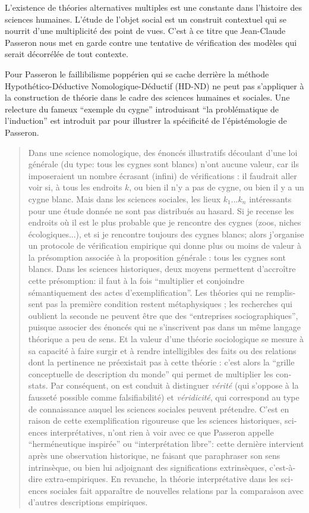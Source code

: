 
L’existence de théories alternatives multiples est une constante dans l’histoire des sciences humaines. L'étude de l'objet social est un construit contextuel qui se nourrit d'une multiplicité des point de vues. C'est à ce titre que Jean-Claude Passeron \autocite{Passeron2006} nous met en garde contre une tentative de vérification  des modèles qui serait décorrélée de tout contexte. 

Pour Passeron le faillibilisme poppérien qui se cache derrière la méthode Hypothético-Déductive Nomologique-Déductif (HD-ND) ne peut pas s'appliquer à la construction de théorie dans le cadre des sciences humaines et sociales. Une relecture du fameux \enquote{exemple du cygne} introduisant \enquote{la problématique de l'induction} est introduit par \cite{Allard2000} pour illustrer la spécificité de l'épistémologie de Passeron.

\foreignblockquote{english}[\cite{Allard2000}]{Dans une science nomologique, des énoncés illustratifs découlant d’une loi générale (du type: tous les cygnes sont blancs) n’ont aucune valeur, car ils imposeraient un nombre écrasant (infini) de vérifications : il faudrait aller voir si, à tous les endroits $k$, ou bien il n’y a pas de cygne, ou bien il y a un cygne blanc. Mais dans les sciences sociales, les lieux $k_1 ... k_n$ intéressants pour une étude donnée ne sont pas distribués au hasard. Si je recense les endroits où il est le plus probable que je rencontre des cygnes (zoos, niches écologiques...), et si je rencontre toujours des cygnes blancs; alors j’organise un protocole de vérification empirique qui donne plus ou moins de valeur à la présomption associée à la proposition générale : tous les cygnes sont blancs. Dans les sciences historiques, deux moyens permettent d’accroître cette présomption: il faut à la fois \enquote{multiplier et conjoindre sémantiquement des actes d’exemplification}. Les théories qui ne remplissent pas la première condition restent métaphysiques ; les recherches qui oublient la seconde ne peuvent être que des \enquote{entreprises sociographiques}, puisque associer des énoncés qui ne s’inscrivent pas dans un même langage théorique a peu de sens. Et la valeur d’une théorie sociologique se mesure à sa capacité à faire surgir et à rendre intelligibles des faits ou des relations dont la pertinence ne préexistait pas à cette théorie : c’est alors la \enquote{grille conceptuelle de description du monde} qui permet de multiplier les constats. Par conséquent, on est conduit à distinguer \textit{vérité} (qui s’oppose à la fausseté possible comme falsifiabilité) et \textit{véridicité}, qui correspond au type de connaissance auquel les sciences sociales peuvent prétendre. C’est en raison de cette exemplification rigoureuse que les sciences historiques, sciences interprétatives, n’ont rien à voir avec ce que Passeron appelle \enquote{herméneutique inspirée} ou \enquote{interprétation libre}: cette dernière intervient après une observation historique, ne faisant que paraphraser son sens intrinsèque, ou bien lui adjoignant des significations extrinsèques, c’est-à-dire extra-empiriques. En revanche, la théorie interprétative dans les sciences sociales fait apparaître de nouvelles relations par la comparaison avec d’autres descriptions empiriques.}

